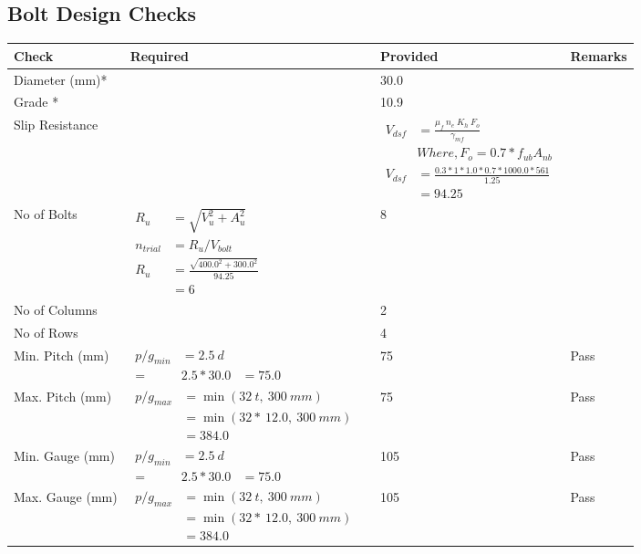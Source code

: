 \documentclass{article}%
\begin{document}
\subsection{Bolt Design Checks}%
\label{subsec:BoltDesignChecks}%
\renewcommand{\arraystretch}{1.2}%
\begin{longtable}{|p{4cm}|p{5cm}|p{5.5cm}|p{1.5cm}|}%
\hline%
\rowcolor{OsdagGreen}%
Check&Required&Provided&Remarks\\%
\hline%
\endhead%
\hline%
Diameter (mm)*&&30.0&\\%
\hline%
Grade *&&10.9&\\%
\hline%
Slip Resistance&&$\begin{aligned}V_{dsf} & = \frac{\mu_f~ n_e~  K_h~ F_o}{\gamma_{mf}}\\ & Where, F_o = 0.7 * f_{ub} A_{nb}\\ V_{dsf} & = \frac{0.3*1*1.0* 0.7 *1000.0*561}{1.25}\\ & =94.25\end{aligned}$&\\%
\hline%
No of Bolts&$\begin{aligned}R_{u} &= \sqrt{V_u^2+A_u^2}\\ n_{trial} &= R_u/ V_{bolt}\\ R_{u} &= \frac{\sqrt{400.0^2+300.0^2}}{94.25}\\ &=6\end{aligned}$&8&\\%
\hline%
No of Columns&&2&\\%
\hline%
No of Rows&&4&\\%
\hline%
Min. Pitch (mm)&$\begin{aligned}p/g_{min}&= 2.5 ~ d&\\ =&2.5*30.0&=75.0\end{aligned}$&75&Pass\\%
\hline%
Max. Pitch (mm)&$\begin{aligned}p/g_{max} &=\min(32~t,~300~mm)&\\ &=\min(32 *~12.0,~ 300 ~mm)\\&=384.0\end{aligned}$&75&Pass\\%
\hline%
Min. Gauge (mm)&$\begin{aligned}p/g_{min}&= 2.5 ~ d&\\ =&2.5*30.0&=75.0\end{aligned}$&105&Pass\\%
\hline%
Max. Gauge (mm)&$\begin{aligned}p/g_{max} &=\min(32~t,~300~mm)&\\ &=\min(32 *~12.0,~ 300 ~mm)\\&=384.0\end{aligned}$&105&Pass\\%

\end{longtable}
\end{document}

